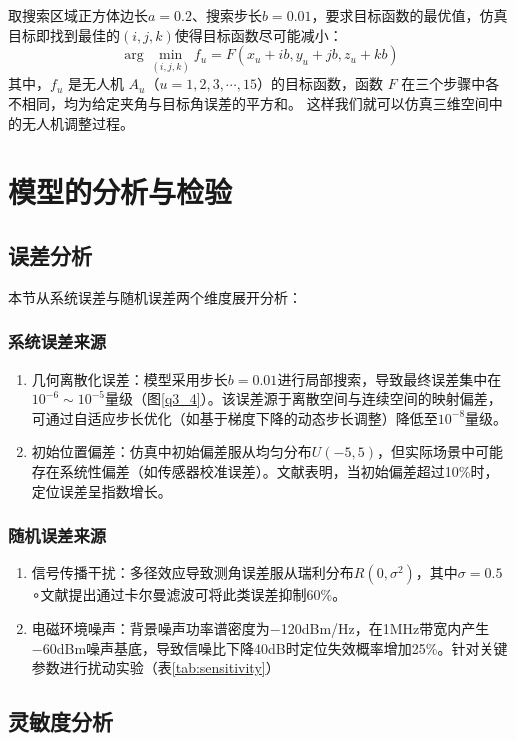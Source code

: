 \documentclass[withoutpreface,bwprint]{cumcmthesis} %
\begin{document}
取搜索区域正方体边长\( a = 0.2 \)、搜索步长\( b = 0.01 \)，要求目标函数的最优值，仿真目标即找到最佳的\( (i,j,k) \)使得目标函数尽可能减小：
\[
\arg\min\limits_{(i,j,k)} f_u = F(x_u + ib, y_u + jb, z_u + kb)
\]
其中，\( f_u \) 是无人机 \( A_u \)（\( u = 1,2,3,\cdots,15 \)）的目标函数，函数 \( F \) 在三个步骤中各不相同，均为给定夹角与目标角误差的平方和。
这样我们就可以仿真三维空间中的无人机调整过程。


\section{模型的分析与检验}
\subsection{误差分析}
本节从系统误差与随机误差两个维度展开分析：

\subsubsection{系统误差来源}


\begin{enumerate}
    \item ​几何离散化误差​​：模型采用步长$b=0.01$进行局部搜索，导致最终误差集中在$10^{-6} \sim 10^{-5}$量级（图\ref{q3_4}）。该误差源于离散空间与连续空间的映射偏差，可通过自适应步长优化（如基于梯度下降的动态步长调整）降低至$10^{−8}$量级。
    \item ​​初始位置偏差​​：仿真中初始偏差服从均匀分布$U(−5,5)$，但实际场景中可能存在系统性偏差（如传感器校准误差）。文献表明，当初始偏差超过10\%时，定位误差呈指数增长。
\end{enumerate}
\subsubsection{随机误差来源}

\begin{enumerate}
    \item ​​信号传播干扰​​：多径效应导致测角误差服从瑞利分布$R(0,\sigma^2)$，其中$\sigma=0.5$ ∘文献提出通过卡尔曼滤波可将此类误差抑制60\%。
    \item ​​电磁环境噪声​：背景噪声功率谱密度为−120dBm/Hz，在1MHz带宽内产生−60dBm噪声基底，导致信噪比下降40dB时定位失效概率增加25\%。针对关键参数进行扰动实验（表\ref{tab:sensitivity}）
\end{enumerate}

\subsection{灵敏度分析}
\end{document}
